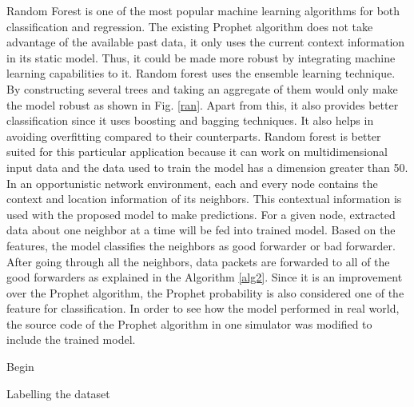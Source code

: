 \documentclass[10pt,journal]{IEEEtran}
\begin{document}
Random Forest is one of the most popular machine learning algorithms for both classification and regression. The existing Prophet algorithm does not take advantage of the available past data, it only uses the current context information in its static model. Thus, it could be made more robust by integrating machine learning capabilities to it. Random forest uses the ensemble learning technique. By constructing several trees and taking an aggregate of them would only make the model robust as shown in Fig. \ref{ran}. Apart from this, it also provides better classification since it uses boosting and bagging techniques. It also helps in avoiding overfitting compared to their counterparts. Random forest is better suited for this particular application because it can work on multidimensional input data and the data used to train the model has a dimension greater than 50.
In an opportunistic network environment, each and every node contains the context and location information of its neighbors. This contextual information is used with the proposed model to make predictions. 
For a given node, extracted data about one neighbor at a time will be fed into trained model. Based on the features, the model classifies the neighbors as good forwarder or bad forwarder. After going through all the neighbors, data packets are forwarded to all of the good forwarders as explained in the Algorithm \ref{alg2}.  
Since it is an improvement over the Prophet algorithm, the Prophet probability is also considered one of the feature for classification. In order to see how the model performed in real world, the source code of the Prophet algorithm in one simulator was modified to include the trained model. 


\begin {algorithm}
\SetAlgoLined
{}
Begin \;
\caption{Labelling the dataset}
\label{alg1}
\end {algorithm}
\end{document}
